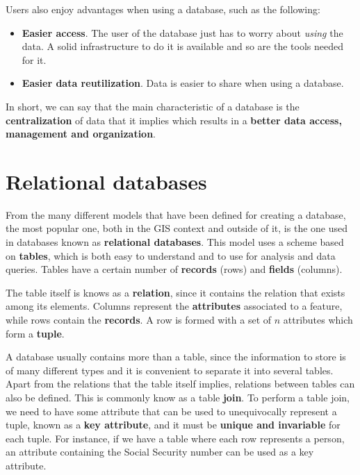 Users also enjoy advantages when using a database, such as the following:

\begin{itemize}
	\item \textbf{Easier access}. The user of the database just has to worry about \emph{using} the data. A solid infrastructure to do it is available and so are the tools needed for it.
	\item \textbf{Easier data reutilization}. Data is easier to share when using a database.
\end{itemize}

In short, we can say that the main characteristic of a database is the \textbf{centralization} of data that it implies which results in a \textbf{better data access, management and organization}.


\section{Relational databases}

From the many different models that have been defined for creating a database, the most popular one, both in the GIS context and outside of it, is the one used in databases known as \textbf{relational databases}. This model uses a scheme based on \textbf{tables}, which is both easy to understand and to use for analysis and data queries. Tables have a certain number of \textbf{records} (rows) and \textbf{fields} (columns).

The table itself is knows as a \textbf{relation}, since it contains the relation that exists among its elements. Columns represent the \textbf{attributes} associated to a feature, while rows contain the \textbf{records}. A row is formed with a set of $n$ attributes which form a \textbf{tuple}.

A database usually contains more than a table, since the information to store is of many different types and it is convenient to separate it into several tables. Apart from the relations that the table itself implies, relations between tables can also be defined. This is commonly know as a table \textbf{join}. To perform a table join, we need to have some attribute that can be used to unequivocally represent a tuple, known as a \textbf{key attribute}, and it must be \textbf{unique and invariable} for each tuple. For instance, if we have a table where each row represents a person, an attribute containing the Social Security number can be used as a key attribute.

